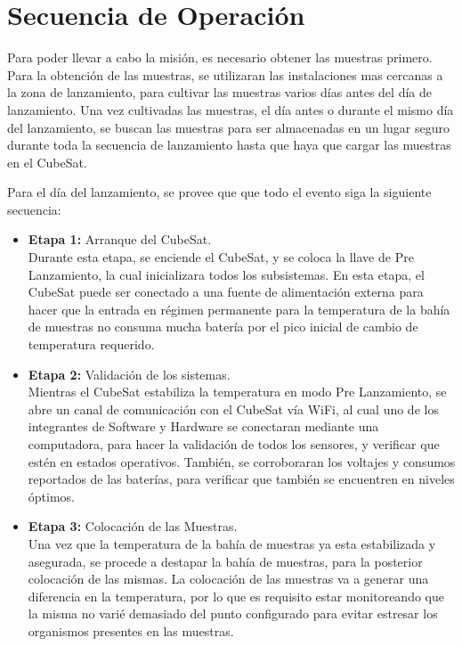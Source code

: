 \section{Secuencia de Operación}
  Para poder llevar a cabo la misión, es necesario obtener las muestras primero. Para la obtención de las muestras, se
  utilizaran las instalaciones mas cercanas a la zona de lanzamiento, para cultivar las muestras varios días antes del
  día de lanzamiento. Una vez cultivadas las muestras, el día antes o durante el mismo día del lanzamiento, se buscan
  las muestras para ser almacenadas en un lugar seguro durante toda la secuencia de lanzamiento hasta que haya que
  cargar las muestras en el CubeSat.

  Para el día del lanzamiento, se provee que que todo el evento siga la siguiente secuencia:
  \begin{itemize}
    \item \textbf{Etapa 1:} Arranque del CubeSat.\\
      Durante esta etapa, se enciende el CubeSat, y se coloca la llave de Pre Lanzamiento, la cual inicializara todos
      los subsistemas. En esta etapa, el CubeSat puede ser conectado a una fuente de alimentación externa para hacer que
      la entrada en régimen permanente para la temperatura de la bahía de muestras no consuma mucha batería por el pico inicial
      de cambio de temperatura requerido.
    \item \textbf{Etapa 2:} Validación de los sistemas.\\
      Mientras el CubeSat estabiliza la temperatura en modo Pre Lanzamiento, se abre un canal de comunicación con el
      CubeSat vía WiFi, al cual uno de los integrantes de Software y Hardware se conectaran mediante una computadora,
      para hacer la validación de todos los sensores, y verificar que estén en estados operativos. También, se
      corroboraran los voltajes y consumos reportados de las baterías, para verificar que también se encuentren en
      niveles óptimos.
    \item \textbf{Etapa 3:} Colocación de las Muestras.\\
      Una vez que la temperatura de la bahía de muestras ya esta estabilizada y asegurada, se procede a destapar la
      bahía de muestras, para la posterior colocación de las mismas. La colocación de las muestras va a generar una
      diferencia en la temperatura, por lo que es requisito estar monitoreando que la misma no varié demasiado del punto
      configurado para evitar estresar los organismos presentes en las muestras.

\end{itemize}
